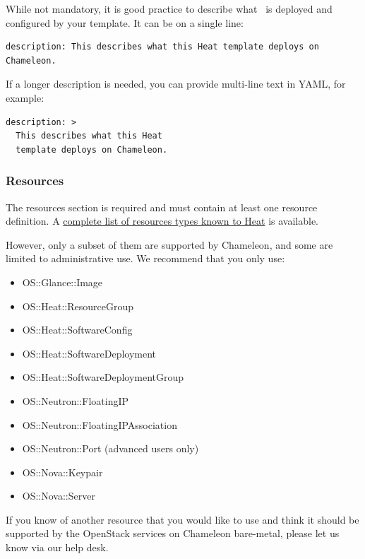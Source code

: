 While not mandatory, it is good practice to describe what ~is deployed
and configured by your template. It can be on a single line:

\begin{footnotesize}
\begin{verbatim}
description: This describes what this Heat template deploys on Chameleon.
\end{verbatim}
\end{footnotesize}

If a longer description is needed, you can provide multi-line text in
YAML, for example:

\begin{footnotesize}
\begin{verbatim}
description: >
  This describes what this Heat
  template deploys on Chameleon.
\end{verbatim}
\end{footnotesize}

\subsubsection{Resources}

The resources section is required and must contain at least one resource
definition. A
\href{http://docs.openstack.org/developer/heat/template_guide/openstack.html}{complete
list of resources types known to Heat} is available.

However, only a subset of them are supported by Chameleon, and some are
limited to administrative use. We recommend that you only use:

\begin{itemize}
\item
  OS::Glance::Image
\item
  OS::Heat::ResourceGroup
\item
  OS::Heat::SoftwareConfig
\item
  OS::Heat::SoftwareDeployment
\item
  OS::Heat::SoftwareDeploymentGroup
\item
  OS::Neutron::FloatingIP
\item
  OS::Neutron::FloatingIPAssociation
\item
  OS::Neutron::Port (advanced users only)
\item
  OS::Nova::Keypair
\item
  OS::Nova::Server
\end{itemize}

If you know of another resource that you would like to use and think it
should be supported by the OpenStack services on Chameleon bare-metal,
please let us know via our help desk.

